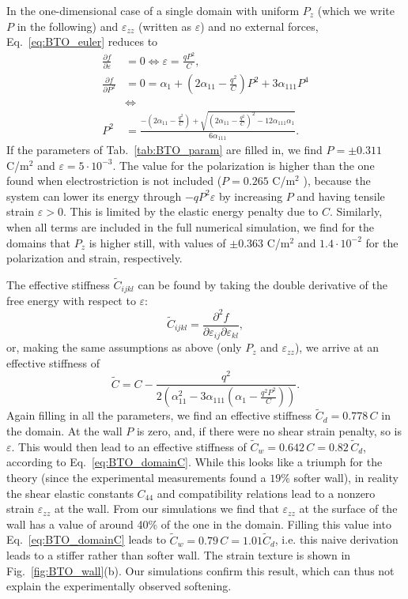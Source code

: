 In the one-dimensional case of a single domain with uniform $P_z$ (which we write $P$ in the following) and $\varepsilon_{zz}$ (written as $\varepsilon$) and no external forces, Eq.~\eqref{eq:BTO_euler} reduces to  
\begin{align}
	\frac{\partial f}{\partial \varepsilon} &= 0 \Leftrightarrow \varepsilon = \frac{qP^2}{C}\label{eq:BTO_e0},\\
	\frac{\partial f}{\partial P^2} &= 0 = \alpha_1 + (2 \alpha_{11} - \frac{q^2}{C})P^2 + 3\alpha_{111}P^4 \\
	& \Leftrightarrow \\
	P^2 &= \frac{-(2\alpha_{11} - \frac{q^2}{C}) + \sqrt{(2\alpha_{11}-\frac{q^2}{C})^2 - 12 \alpha_{111} \alpha_1}}{6\alpha_{111}}.
\end{align}
If the parameters of Tab.~\ref{tab:BTO_param} are filled in, we find $P = \pm 0.311$ C/m$^2$ and $\varepsilon = 5 \cdot 10^{-3}$.
The value for the polarization is higher than the one found when electrostriction is not included ($P = 0.265$ C/m$^2$ \cite{Marton2010}), because the system can lower its energy through $-qP^2\varepsilon$ by increasing $P$ and having tensile strain $\varepsilon > 0$. This is limited by the elastic energy penalty due to $C$.
Similarly, when all terms are included in the full numerical simulation, we find for the domains that $P_z$ is higher still, with values of $\pm 0.363$ C/m$^2$ and $1.4 \cdot 10^{-2}$ for the polarization and strain, respectively.

The effective stiffness $\tilde{C}_{ijkl}$ can be found by taking the double derivative of the free energy with respect to $\varepsilon$:
\begin{equation}
	\tilde{C}_{ijkl} = \frac{\partial^2 f}{\partial \varepsilon_{ij} \partial \varepsilon_{kl}},
\end{equation}
or, making the same assumptions as above (only $P_z$ and $\varepsilon_{zz}$), we arrive at an effective stiffness of
\begin{equation}
	\label{eq:BTO_domainC}
	\tilde{C} = C - \frac{q^2}{2\left(\alpha_{11}^2 - 3 \alpha_{111}\left(\alpha_1  - \frac{q^2 P^2}{C}\right)\right)}.
\end{equation}
Again filling in all the parameters, we find an effective stiffness $\tilde{C}_d = 0.778 \,C$ in the domain.
At the wall $P$ is zero, and, if there were no shear strain penalty, so is $\varepsilon$. This would then lead to an effective stiffness of $\tilde{C}_w = 0.642 \, C = 0.82\, \tilde{C}_d$, according to Eq.~\eqref{eq:BTO_domainC}.
While this looks like a triumph for the theory (since the experimental measurements found a $19\%$ softer wall), in reality the shear elastic constants $C_{44}$ and compatibility relations lead to a nonzero strain $\varepsilon_{zz}$ at the wall.
From our simulations we find that $\varepsilon_{zz}$ at the surface of the wall has a value of around 40\% of the one in the domain.
Filling this value into Eq.~\eqref{eq:BTO_domainC} leads to $\tilde{C}_w = 0.79 \, C = 1.01 \tilde{C}_d$, i.e. this naive derivation leads to a stiffer rather than softer wall.
The strain texture is shown in Fig.~\ref{fig:BTO_wall}(b).
Our simulations confirm this result, which can thus not explain the experimentally observed softening.

